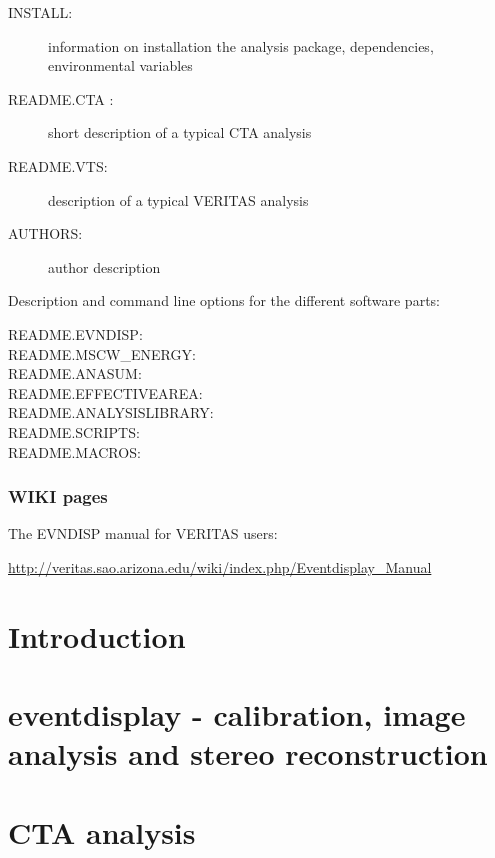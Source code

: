 \documentclass[titlepage,a4paper,twoside,11pt]{report}
\newcommand{\clearemptydoublepage}{\newpage{\pagestyle{empty}\cleardoublepage}}
\begin{document}
\begin{description}
\item[INSTALL:]   information on installation the analysis package, dependencies, environmental variables
\item[README.CTA :]  short description of a typical CTA analysis
\item[README.VTS:]      description of a typical VERITAS analysis
\item[AUTHORS:]		author description
\end{description}

\noindent Description and command line options for the different software parts:

\begin{description}
\item[README.EVNDISP:]
\item[README.MSCW\_ENERGY:]
\item[README.ANASUM:]
\item[README.EFFECTIVEAREA:]
\item[README.ANALYSISLIBRARY:]
\item[README.SCRIPTS:]
\item[README.MACROS:]
\end{description}

\subsection*{WIKI pages}

The EVNDISP manual for VERITAS users: 

\url{http://veritas.sao.arizona.edu/wiki/index.php/Eventdisplay\_Manual}

\clearemptydoublepage

\chapter{Introduction}

\chapter{eventdisplay - calibration, image analysis and stereo reconstruction}



\chapter{CTA analysis}
\end{document}
